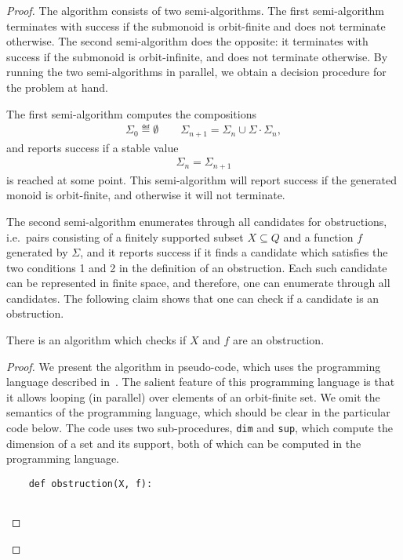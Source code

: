 \begin{proof}
    The algorithm consists of two semi-algorithms. The first semi-algorithm terminates with success if the submonoid is orbit-finite and does not terminate otherwise. The second semi-algorithm does the opposite: it terminates with success if the submonoid is orbit-infinite, and does not terminate otherwise. By running the two semi-algorithms in parallel, we obtain a decision procedure for the problem at hand.
    
    The first semi-algorithm computes the compositions 
    \begin{align*}
    \Sigma_0 \eqdef \emptyset \qquad \Sigma_{n+1} = \Sigma_n \cup \Sigma \cdot \Sigma_n,
    \end{align*}
    and reports success if a stable value 
    \begin{align*}
    \Sigma_n = \Sigma_{n+1}
    \end{align*}
    is reached at some point. This semi-algorithm will report success if the generated monoid is orbit-finite, and otherwise it will not terminate. 
    
    The second semi-algorithm enumerates through all candidates for obstructions, i.e.~pairs consisting of a finitely supported subset $X \subseteq Q$ and a function $f$ generated by $\Sigma$, and it reports success if it finds a candidate which satisfies the two conditions 1 and 2 in the definition of an obstruction. Each such candidate can be represented in finite space, and therefore, one can enumerate through all candidates. The following claim shows that one can check if a candidate is an obstruction.
    
    \begin{claim}
        There is an algorithm which checks if $X$ and $f$ are an obstruction.
    \end{claim}
    \begin{proof}
        We present the algorithm in  pseudo-code, which uses the programming language described in~\cite[Section 11]{bojanczyk_slightly2018}. The salient feature of this programming language is that it allows looping (in parallel) over elements of an orbit-finite set. We omit the semantics of the programming language, which should be clear in the particular code below.   The code uses two sub-procedures, 
    \texttt{dim} and \texttt{sup}, which compute the dimension of a set and its support, both of which can be computed in the programming language.
        \begin{lstlisting}
	def obstruction(X, f):


\end{lstlisting}
\end{proof}
\end{proof}

